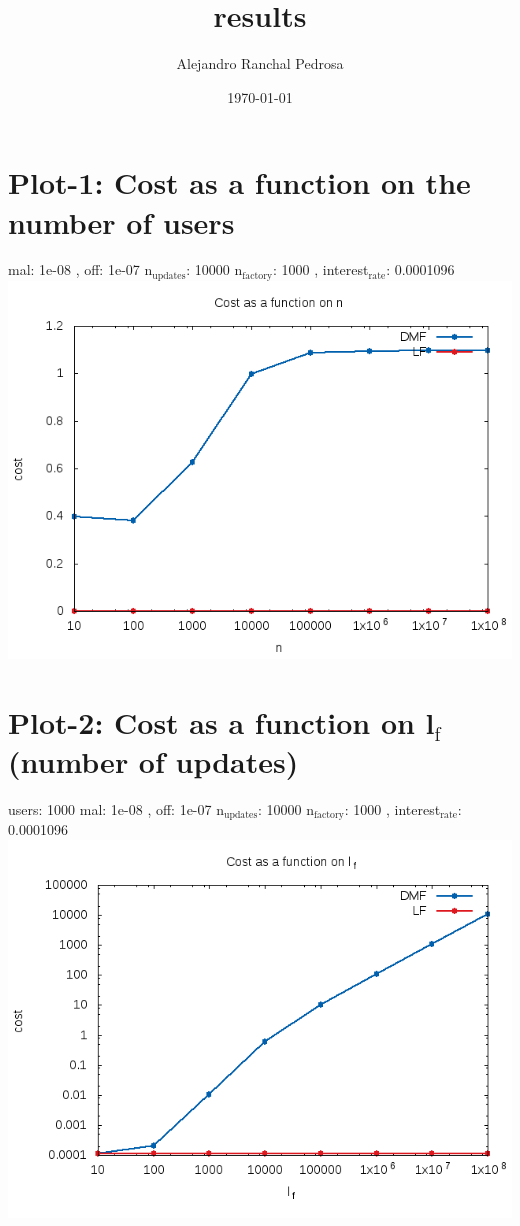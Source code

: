 \documentclass[11pt]{article}
\author{Alejandro Ranchal Pedrosa}
\date{\today}
\title{results}
\begin{document}
\maketitle
\tableofcontents

\section{Plot-1: Cost as a function on the number of users}
\label{sec-1}
mal: 1e-08 , off: 1e-07 n$_{\text{updates}}$: 10000 n$_{\text{factory}}$: 1000 , interest$_{\text{rate}}$: 0.0001096
\includegraphics[width=.9\linewidth]{./plot-1-final.png}
\section{Plot-2: Cost as a function on l$_{\text{f}}$ (number of updates)}
\label{sec-2}
users: 1000 mal: 1e-08 , off: 1e-07 n$_{\text{updates}}$: 10000 n$_{\text{factory}}$: 1000 , interest$_{\text{rate}}$: 0.0001096
\includegraphics[width=.9\linewidth]{./plot-2-final.png}
\end{document}
